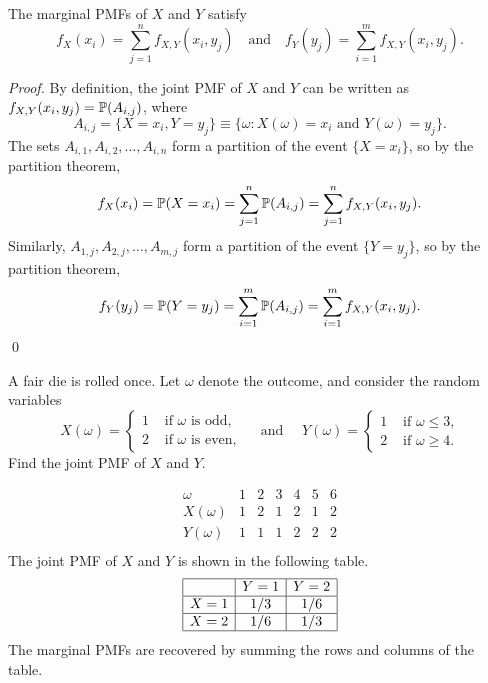 \begin{lemma}
The marginal PMFs of $X$ and $Y$ satisfy
\[
f_X(x_i) = \sum_{j=1}^n f_{X,Y}(x_i,y_j) \quad\text{and}\quad f_Y(y_j) = \sum_{i=1}^m f_{X,Y}(x_i,y_j).
\]
\end{lemma}

\begin{proof}
By definition, the joint PMF of $X$ and $Y$ can be written as $f_{X,Y}(x_i,y_j) = \mathbb{P}(A_{i,j})$, where
\[
A_{i,j} = \{X=x_i, Y=y_j\} \equiv \{\omega: X(\omega)=x_i \text{ and } Y(\omega) = y_j\}.
\]
The sets $A_{i,1}, A_{i,2},\ldots,A_{i,n}$ form a partition of the event $\{X=x_i\}$, so by the partition theorem,
\[
f_X(x_i) = \mathbb{P}(X=x_i) = \sum_{j=1}^n \mathbb{P}(A_{i,j}) = \sum_{j=1}^n f_{X,Y}(x_i,y_j). \\
\]
Similarly, $A_{1,j}, A_{2,j},\ldots,A_{m,j}$ form a partition of the event $\{Y=y_j\}$, so by the partition theorem,
\[
f_Y(y_j) = \mathbb{P}(Y=y_j) = \sum_{i=1}^m \mathbb{P}(A_{i,j}) = \sum_{i=1}^m f_{X,Y}(x_i,y_j).
\]
\qed
\end{proof}

\begin{example}\label{ex:joint:dice}
A fair die is rolled once. Let $\omega$ denote the outcome, and consider the random variables
\[
X(\omega) = \left\{\begin{array}{cl}
	1 & \text{ if $\omega$ is odd,} \\
	2 & \text{ if $\omega$ is even,}
\end{array}\right. 
\quad\mbox{ and }\quad
Y(\omega) = \left\{\begin{array}{cl}
	1 & \text{ if $\omega\leq 3$,} \\
	2 & \text{ if $\omega\geq 4$.}
\end{array}\right.
\]
Find the joint PMF of $X$ and $Y$.
\end{example}

\begin{solution}
\[
\begin{array}{c|cccccc}
\omega 	& 1 & 2 & 3 & 4 & 5 & 6 \\ \hline
X(\omega) 	& 1 & 2 & 1 & 2 & 1 & 2 \\
Y(\omega) 	& 1 & 1 & 1 & 2 & 2 & 2 \\
\end{array}
\]
The joint PMF of $X$ and $Y$ is shown in the following table.
\[
\begin{array}{|c|c|c|} \hline
	& Y=1 	& Y=2 \\ \hline
X=1	& 1/3	& 1/6 \\ \hline
X=2	& 1/6 	& 1/3 \\ \hline
\end{array}
\]
The marginal PMFs are recovered by summing the rows and columns of the table.
\end{solution}

